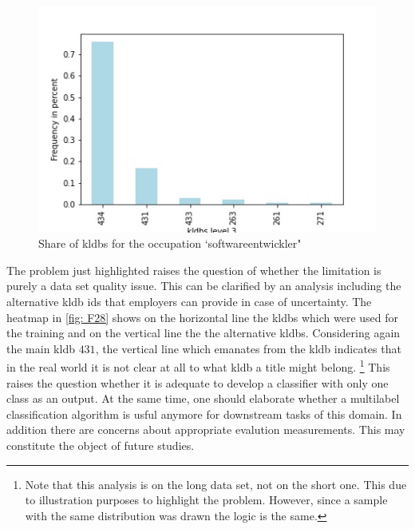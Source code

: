 \documentclass[12pt, a4paper, titlepage]{article}
\begin{document}
\begin{figure}[hb!]
  \center
  \includegraphics[scale=0.5]{kldbs_frequency_softwareentwickler.jpg}
  \caption{\label{fig: F27} Share of kldbs for the occupation `softwareentwickler"}
\end{figure}

The problem just highlighted raises the question of whether the limitation is purely a data set quality issue. This can be clarified by an analysis including the alternative kldb ids that employers can provide in case of uncertainty. The heatmap in \ref{fig: F28} shows on the horizontal line the kldbs which were used for the training and on the vertical line the the alternative kldbs. Considering again the main kldb $431$, the vertical line which emanates from the kldb indicates that in the real world it is not clear at all to what kldb a title might belong. \footnote{Note that this analysis is on the long data set, not on the short one. This due to illustration purposes to highlight the problem. However, since a sample with the same distribution was drawn the logic is the same.} This raises the question whether it is adequate to develop a classifier with only one class as an output. At the same time, one should elaborate whether a multilabel classification algorithm is usful anymore for downstream tasks of this domain. In addition there are concerns about appropriate evalution measurements. This may constitute the object of future studies.
\end{document}
